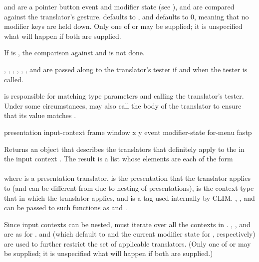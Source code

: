  and  are a pointer button event and modifier
state (see ), and are compared against the
translator's gesture.   defaults to , and
 defaults to 0, meaning that no modifier keys are held down.
Only one of  or  may be supplied; it is
unspecified what will happen if both are supplied.

If  is , the comparison against  and
 is not done.

, , , , ,
, and  are passed along to the translator's tester if and
when the tester is called.

 is responsible for matching type parameters
and calling the translator's tester.  Under some circumstances,
 may also call the body of the translator to
ensure that its value matches .


 {presentation input-context frame window x y
                                      \key event modifier-state for-menu fastp}

Returns an object that describes the translators that definitely apply to the
  in the input context .
The result is a list whose elements are each of the form
\\
\\
where  is a presentation translator,  is
the presentation that the translator applies to (and can be different from
 due to nesting of presentations),  is the
context type that in which the translator applies, and  is a tag used
internally by CLIM.  , , and
 can be passed to such functions as
 and .

Since input contexts can be nested,  must
iterate over all the contexts in .  , ,
and  are as for .   and
 (which default to  and the current modifier state
for , respectively) are used to further restrict the set of
applicable translators.  (Only one of  or  may be
supplied; it is unspecified what will happen if both are supplied.)

